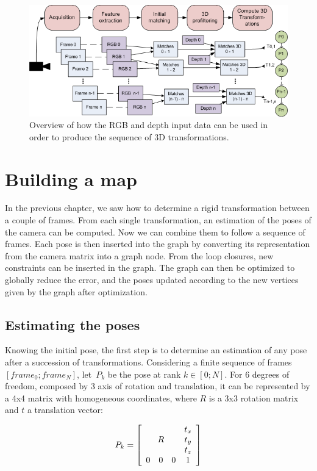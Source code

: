 \begin{figure}[H]
\centering
\includegraphics[width=1.0\textwidth]{figures/overview_rgb_depth}
\caption{Overview of how the RGB and depth input data can be used in order to produce the sequence of 3D transformations.}
\end{figure}

\chapter{Building a map}
\label{chap:map}

In the previous chapter, we saw how to determine a rigid transformation between a couple of frames. From each single transformation, an estimation of the poses of the camera can be computed. Now we can combine them to follow a sequence of frames. Each pose is then inserted into the graph by converting its representation from the camera matrix into a graph node. From the loop closures, new constraints can be inserted in the graph. The graph can then be optimized to globally reduce the error, and the poses updated according to the new vertices given by the graph after optimization.

\section{Estimating the poses}

Knowing the initial pose, the first step is to determine an estimation of any pose after a succession of transformations. Considering a finite sequence of frames $[frame_0 ; frame_N]$, let~$P_k$ be the pose at rank $k \in [0;N]$. For 6 degrees of freedom, composed by 3 axis of rotation and translation, it can be represented by a 4x4 matrix with homogeneous coordinates, where $R$ is a 3x3 rotation matrix and $t$ a translation vector:

$$
P_k = \left[ \begin{array}{cccc}
 \multicolumn{3}{c}{\multirow{3}{*}{$R$}} & t_x \\
 & & & t_y \\
 & & & t_z \\
0 & 0 & 0 & 1 \end{array} \right] 
$$

